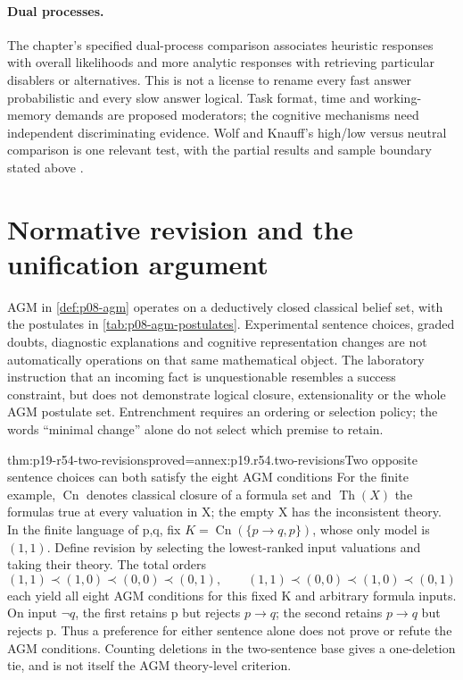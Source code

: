 \paragraph{Dual processes.}
The chapter's specified dual-process comparison associates heuristic
responses with overall likelihoods and more analytic responses with
retrieving particular disablers or alternatives. This is not a license
to rename every fast answer probabilistic and every slow answer logical.
Task format, time and working-memory demands are proposed moderators;
the cognitive mechanisms need independent discriminating evidence.
Wolf and Knauff's high/low versus neutral comparison is one relevant
test, with the partial results and sample boundary stated above
\cite[\S4.3]{GazzoCastanedaKnauff2021Defeasible}.

\section{Normative revision and the unification argument}
\label{sec:p19-r54-normative-bridge}

AGM in \cref{def:p08-agm} operates on a deductively closed classical
belief set, with the postulates in \cref{tab:p08-agm-postulates}.
Experimental sentence choices, graded doubts, diagnostic explanations
and cognitive representation changes are not automatically operations
on that same mathematical object. The laboratory instruction that an
incoming fact is unquestionable resembles a success constraint, but
does not demonstrate logical closure, extensionality or the whole AGM
postulate set. Entrenchment requires an ordering or selection policy;
the words ``minimal change'' alone do not select which premise to retain.

\begin{hbtheorem}{thm:p19-r54-two-revisions}{proved=annex:p19.r54.two-revisions}{Two opposite sentence choices can both satisfy the eight AGM conditions}
For the finite example, \(\operatorname{Cn}\) denotes classical closure
of a formula set and \(\operatorname{Th}(X)\) the formulas true at
every valuation in X; the empty X has the inconsistent theory.
In the finite language of p,q, fix \(K=\operatorname{Cn}(\{p\to q,p\})\),
whose only model is \((1,1)\). Define revision by selecting the
lowest-ranked input valuations and taking their theory. The total
orders
\[
 (1,1)\prec(1,0)\prec(0,0)\prec(0,1),\qquad
 (1,1)\prec(0,0)\prec(1,0)\prec(0,1)
\]
each yield all eight AGM conditions for this fixed K and arbitrary
formula inputs. On input \(\neg q\), the first retains p but rejects
\(p\to q\); the second retains \(p\to q\) but rejects p.
Thus a preference for either sentence alone does not prove or refute
the AGM conditions. Counting deletions in the two-sentence base gives
a one-deletion tie, and is not itself the AGM theory-level criterion.
\end{hbtheorem}


